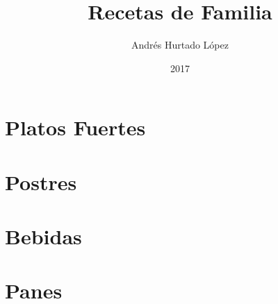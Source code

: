 \documentclass[letterpaper,10pt]{book}
\begin{document}
\title{Recetas de Familia}
\author{Andrés Hurtado López}
\date{2017}

\frontmatter



\tableofcontents
\mainmatter
\part{Platos Fuertes}























































\part{Postres}






\part{Bebidas}

\part{Panes}

\backmatter

\end{document}
